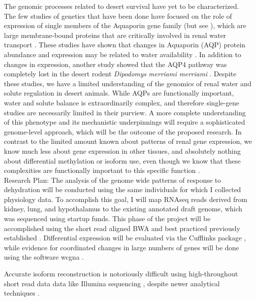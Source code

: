 \documentclass[11pt]{article}
\begin{document}
The genomic processes related to desert survival have yet to be characterized. The few studies of genetics that have been done have focused on the role of expression of single members of the Aquaporin gene family (but see \cite{Bartolo:2007hy}), which are large membrane-bound proteins that are critically involved in renal water transport \citep{Kwon:2009bv,Verkman:2002ww,Brown:1995vo,Nielsen:1995cb}. These studies have shown that changes in Aquaporin (AQP) protein abundance and expression may be related to water availability \citep{Boselt:2009fb, Gallardo:2005fm,Bozinovic:2003eg}. In addition to changes in expression, another study showed that the AQP4 pathway was completely lost in the desert rodent \textit{Dipodomys merriami merriami} \citep{Huang:2001ti}. Despite these studies, we have a limited understanding of the genomics of renal water and solute regulation in desert animals. While AQPs are functionally important, water and solute balance is extraordinarily complex, and therefore single-gene studies are necessarily limited in their purview. A more complete understanding of this phenotype and its mechanistic underpinnings will require a sophisticated genome-level approach, which will be the outcome of the proposed research. In contrast to the limited amount known about patterns of renal gene expression, we know much less about gene expression in other tissues, and absolutely nothing about differential methylation or isoform use, even though we know that these complexities are functionally important to this specific function \citep{Yukutake:2010ia,Silberstein:2004ex}. \\

Research Plan: The analysis of the genome wide patterns of response to dehydration will be conducted using the same individuals for which I collected physiology data. To accomplish this goal, I will map RNAseq reads derived from kidney, lung, and hypothalamus to the existing annotated draft genome, which was sequenced using startup funds. This phase of the project will be accomplished using the short read aligned BWA \citep{Li:2013wn} and best practiced previously established \citep{MacManes:2014io}. Differential expression will be evaluated via the Cufflinks package \citep{Trapnell:2012kp}, while evidence for coordinated changes in large numbers of genes will be done using the software wcgna \citep{Langfelder:2008bd}.

Accurate isoform reconstruction is notoriously difficult using high-throughout short read data data like Illumina sequencing \citep{Pyrkosz:2013tm}, despite newer analytical techniques .
\end{document}

